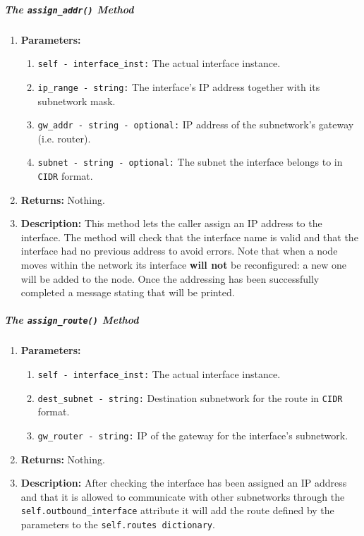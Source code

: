                     \subparagraph{The \texttt{assign\_addr()} Method}
                        \begin{enumerate}
                            \item \textbf{Parameters:}
                            \begin{enumerate}
                                \item \texttt{self - interface\_inst:} The actual interface instance.
                                \item \texttt{ip\_range - string:} The interface's IP address together with its subnetwork mask.
                                \item \texttt{gw\_addr - string - optional:} IP address of the subnetwork's gateway (i.e. router).
                                \item \texttt{subnet - string - optional:} The subnet the interface belongs to in \texttt{CIDR} format.
                            \end{enumerate}
                            \item \textbf{Returns:} Nothing.
                            \item \textbf{Description:} This method lets the caller assign an IP address to the interface. The method will check that the interface name is valid and that the interface had no previous address to avoid errors. Note that when a node moves within the network its interface \textbf{will not} be reconfigured: a new one will be added to the node. Once the addressing has been successfully completed a message stating that will be printed.
                        \end{enumerate}

                    \subparagraph{The \texttt{assign\_route()} Method}
                        \begin{enumerate}
                            \item \textbf{Parameters:}
                            \begin{enumerate}
                                \item \texttt{self - interface\_inst:} The actual interface instance.
                                \item \texttt{dest\_subnet - string:} Destination subnetwork for the route in \texttt{CIDR} format.
                                \item \texttt{gw\_router - string:} IP of the gateway for the interface's subnetwork.
                            \end{enumerate}
                            \item \textbf{Returns:} Nothing.
                            \item \textbf{Description:} After checking the interface has been assigned an IP address and that it is allowed to communicate with other subnetworks through the \texttt{self.outbound\_interface} attribute it will add the route defined by the parameters to the \texttt{self.routes dictionary}.
                        \end{enumerate}

